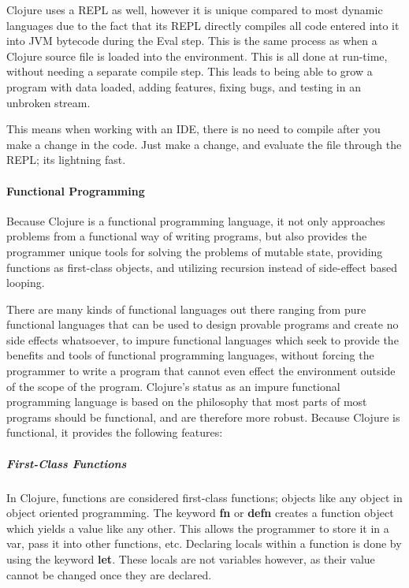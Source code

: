     Clojure uses a REPL as well, however it is unique compared to most dynamic languages due to the fact that its REPL directly compiles all code entered into it into JVM bytecode during the Eval step. This is the same process as when a Clojure source file is loaded into the environment. This is all done at run-time, without needing a separate compile step. This leads to being able to grow a program with data loaded, adding features, fixing bugs, and testing in an unbroken stream.
    
    This means when working with an IDE, there is no need to compile after you make a change in the code. Just make a change, and evaluate the file through the REPL; its lightning fast. \cite{ClojuresSecretWeapon_Website_AdamBard}
    
\paragraph{Functional Programming}

    Because Clojure is a functional programming language, it not only approaches problems from a functional way of writing programs, but also provides the programmer unique tools for solving the problems of mutable state, providing functions as first-class objects, and utilizing recursion instead of side-effect based looping.
    
    There are many kinds of functional languages out there ranging from pure functional languages that can be used to design provable programs and create no side effects whatsoever, to impure functional languages which seek to provide the benefits and tools of functional programming languages, without forcing the programmer to write a program that cannot even effect the environment outside of the scope of the program. Clojure's status as an impure functional programming language is based on the philosophy that most parts of most programs should be functional, and are therefore more robust. Because Clojure is functional, it provides the following features:
    
    \subparagraph{First-Class Functions}
    
    In Clojure, functions are considered first-class functions; objects like any object in object oriented programming. The keyword \textbf{fn} or \textbf{defn} creates a function object which yields a value like any other. This allows the programmer to store it in a var, pass it into other functions, etc. Declaring locals within a function is done by using the keyword \textbf{let}. These locals are not variables however, as their value cannot be changed once they are declared.
    
